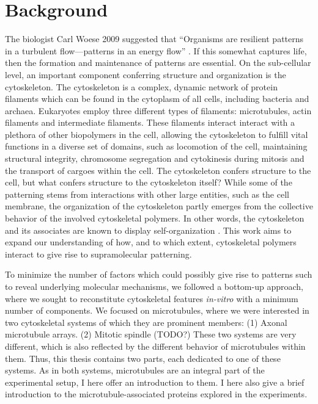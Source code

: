 \chapter{Background}
The biologist Carl Woese 2009 suggested that “Organisms are resilient patterns in a turbulent flow—patterns in an energy flow” \cite{Woese}. If this somewhat captures life, then the formation and maintenance of patterns are essential. On the sub-cellular level, an important component conferring structure and organization is the cytoskeleton. The cytoskeleton is a complex, dynamic network of protein filaments which can be found in the cytoplasm of all cells, including bacteria and archaea. Eukaryotes employ three different types of filaments: microtubules, actin filaments and intermediate filaments. These filaments interact interact with a plethora of other biopolymers in the cell, allowing the cytoskeleton to fulfill vital functions in a diverse set of domains, such as locomotion of the cell, maintaining structural integrity, chromosome segregation and cytokinesis during mitosis and the transport of cargoes within the cell. The cytoskeleton confers structure to the cell, but what confers structure to the cytoskeleton itself? While some of the patterning stems from interactions with other large entities, such as the cell membrane, the organization of the cytoskeleton partly emerges from the collective behavior of the involved cytoskeletal polymers. In other words, the cytoskeleton and its associates are known to display self-organization \parencite{Karsenti2008}. This work aims to expand our understanding of how, and to which extent, cytoskeletal polymers interact to give rise to supramolecular patterning. \par
To minimize the number of factors which could possibly give rise to patterns such to reveal underlying molecular mechanisms, we followed a bottom-up approach, where we sought to reconstitute cytoskeletal features \textit{in-vitro} with a minimum number of components. We focused on microtubules, where we were interested in two cytoskeletal systems of which they are prominent members: (1) Axonal microtubule arrays. (2) Mitotic spindle (TODO?) These two systems are very different, which is also reflected by the different behavior of microtubules within them. Thus, this thesis contains two parts, each dedicated to one of these systems. As in both systems, microtubules are an integral part of the experimental setup, I here offer an introduction to them. I here also give a brief introduction to the microtubule-associated proteins explored in the experiments.
